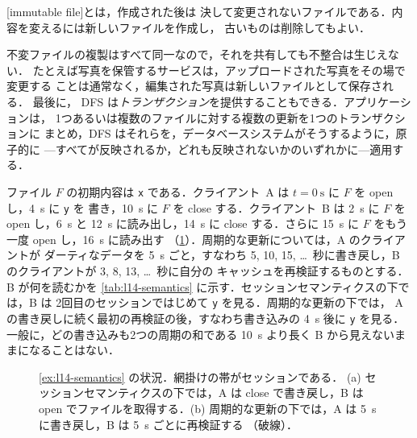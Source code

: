\documentclass[../main.tex]{subfiles}
\begin{document}
\begin{definition}[不変ファイル]
  [immutable file]とは，作成された後は
  決して変更されないファイルである．内容を変えるには新しいファイルを作成し，
  古いものは削除してもよい．
\end{definition}

不変ファイルの複製はすべて同一なので，それを共有しても不整合は生じえない．
たとえば写真を保管するサービスは，アップロードされた写真をその場で変更する
ことは通常なく，編集された写真は新しいファイルとして保存される．
最後に，
DFS は\emph{トランザクション}を提供することもできる．アプリケーションは，
1つあるいは複数のファイルに対する複数の更新を1つのトランザクションに
まとめ，DFS はそれらを，データベースシステムがそうするように，原子的に
---すべてが反映されるか，どれも反映されないかのいずれかに---適用する．

\begin{example}
  \label{ex:l14-semantics}
  ファイル $F$ の初期内容は \texttt{x} である．クライアント~A は
  $t=\SI{0}{\second}$ に $F$ を open し，\SI{4}{\second} に \texttt{y} を
  書き，\SI{10}{\second} に $F$ を close する．クライアント~B は
  \SI{2}{\second} に $F$ を open し，\SI{6}{\second} と
  \SI{12}{\second} に読み出し，\SI{14}{\second} に close する．さらに
  \SI{15}{\second} に $F$ をもう一度 open し，\SI{16}{\second} に読み出す
  （\cref{fig:l14-semantics}）．周期的な更新については，A のクライアントが
  ダーティなデータを \SI{5}{\second} ごと，すなわち 5, 10, 15,
  \ldots~秒に書き戻し，B のクライアントが 3, 8, 13, \ldots~秒に自分の
  キャッシュを再検証するものとする．B が何を読むかを
  \cref{tab:l14-semantics} に示す．セッションセマンティクスの下では，B は
  2回目のセッションではじめて \texttt{y} を見る．周期的な更新の下では，
  A の書き戻しに続く最初の再検証の後，すなわち書き込みの \SI{4}{\second}
  後に \texttt{y} を見る．一般に，どの書き込みも2つの周期の和である
  \SI{10}{\second} より長く B から見えないままになることはない．
\end{example}

\begin{figure}[htbp]
  \centering
  
  \caption{\cref{ex:l14-semantics} の状況．網掛けの帯がセッションである．
    (a) セッションセマンティクスの下では，A は close で書き戻し，B は
    open でファイルを取得する．(b) 周期的な更新の下では，A は
    \SI{5}{\second} に書き戻し，B は \SI{5}{\second} ごとに再検証する
    （破線）．}
  \label{fig:l14-semantics}
\end{figure}
\end{document}
